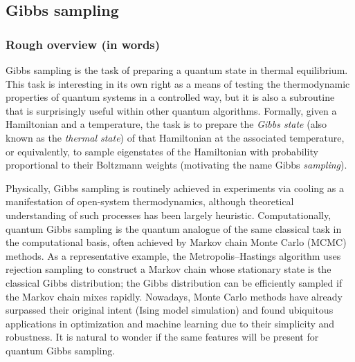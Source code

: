 
\begin{refsection}

\section{Gibbs sampling}\label{prim:GibbsSampling}

\subsubsection*{Rough overview (in words)}

Gibbs sampling is the task of preparing a quantum state in thermal equilibrium. This task is interesting in its own right as a means of testing the thermodynamic properties of quantum systems in a controlled way, but it is also a subroutine that is surprisingly useful within other quantum algorithms. Formally, given a Hamiltonian and a temperature, the task is to prepare the \textit{Gibbs state} (also known as the \textit{thermal state}) of that Hamiltonian at the associated temperature, or equivalently, to sample eigenstates of the Hamiltonian with probability proportional to their Boltzmann weights (motivating the name Gibbs \emph{sampling}).

Physically, Gibbs sampling is routinely achieved in experiments via cooling as a manifestation of open-system thermodynamics, although theoretical understanding of such processes has been largely heuristic. Computationally, quantum Gibbs sampling is the quantum analogue of the same classical task in the computational basis, often achieved by Markov chain Monte Carlo (MCMC) methods. As a representative example, the Metropolis--Hastings algorithm \cite{hastings1970monte} uses rejection sampling to construct a Markov chain whose stationary state is the classical Gibbs distribution; the Gibbs distribution can be efficiently sampled if the Markov chain mixes rapidly. Nowadays, Monte Carlo methods have already surpassed their original intent (Ising model simulation) and found ubiquitous applications in optimization and machine learning due to their simplicity and robustness. It is natural to wonder if the same features will be present for quantum Gibbs sampling.


\end{refsection}
